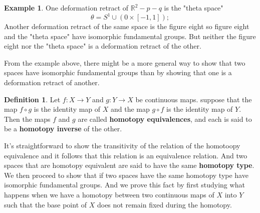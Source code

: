 \documentclass[psamsfonts]{amsart}
\theoremstyle{definition}
\newtheorem{defn}[thm]{Definition}
\newtheorem{exmp}[thm]{Example}
\theoremstyle{remark}
\numberwithin{equation}{section}
\begin{document}
	\begin{exmp}
		One deformation retract of $\mathbb{R}^2-p-q$ is the "theta space"
		\begin{equation}
			\theta = S^1 \cup (0\times [-1,1]);
		\end{equation}
		Another deformation retract of the same space is the figure eight so figure eight and the "theta space" have isomorphic fundamental groups. But neither the figure eight nor the "theta space" is a deformation retract of the other.
	\end{exmp}
	
	From the example above, there might be a more general way to show that two spaces have isomorphic fundamental groups than by showing that one is a deformation retract of another.
	
	\begin{defn}
		Let $f: X \to Y$ and $g: Y \to X$ be continuous maps. suppose that the map $f \circ g$ is the identity map of $X$ and the map $g \circ f$ is the identity map of $Y$. Then the maps $f$ and $g$ are called \textbf{homotopy equivalences}, and each is said to be a \textbf{homotopy inverse} of the other.
	\end{defn}
	It's straightforward to show the transitivity of the relation of the homotoopy equivalence and it follows that this relation is an equivalence relation. And two spaces that are homotopy equivalent are said to have the same \textbf{homotopy type}.\\
	We then proceed to show that if two spaces have the same homotopy type have isomorphic fundamental groups. And we prove this fact by first studying what happens when we have a homotopy between two continuous maps of $X$ into $Y$ such that the base point of $X$ does not remain fixed during the homotopy.
	
\end{document}
